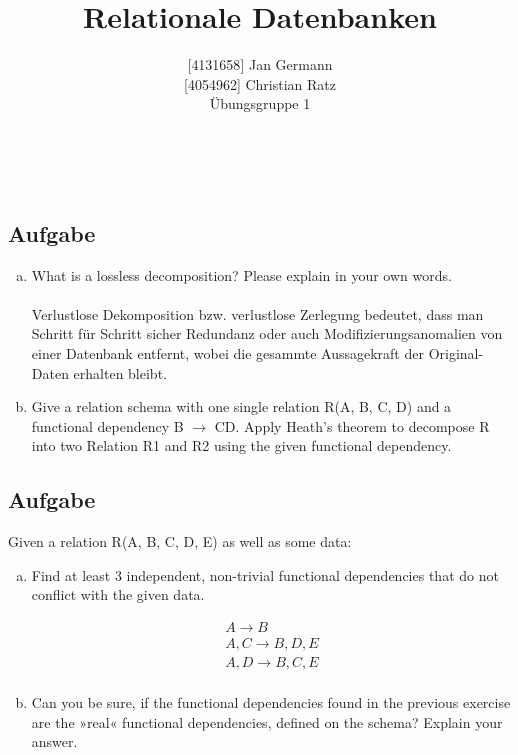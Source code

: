 \documentclass[11pt,a4paper,DIV=9]{scrartcl}
\author{{[}4131658{]} Jan Germann \\{[}4054962{]} Christian Ratz\\Übungsgruppe 1}
\title{Relationale Datenbanken}
\newcounter{temp}
\newcommand{\aufgabe}[1]{
  \setcounter{temp}{\value{subsection}}
  \setcounter{subsection}{#1}
  \addtocounter{subsection}{-1}
  \subsection{Aufgabe}
  \setcounter{subsection}{\value{temp}}
}
\renewcommand{\author}[1]{\renewcommand{\author}{#1}}
\renewcommand{\title}[1]{\renewcommand{\title}{#1}}
\newcommand{\makehomeworktitle}{
  \begin{minipage}[t]{6.5cm}
    \sf{\author}
  \end{minipage}
  \begin{minipage}[t]{6.5cm}
    \begin{flushright}
      \sf{\title\\\today}
    \end{flushright}
  \end{minipage}
  \\[0.2cm]
  \begin{center}
    \sf{
      \color{blue}{
        \LARGE{Aufgabenblatt \blattnr}
      }
    }
  \end{center}
  \vspace{0.1cm}
}
\begin{document}
\makehomeworktitle
\aufgabe{1}
  \begin{enumerate}[a.]
    \item What is a lossless decomposition? Please explain in your own words. \\\\
    Verlustlose Dekomposition bzw. verlustlose Zerlegung bedeutet, dass man Schritt f\"ur Schritt sicher Redundanz oder auch Modifizierungsanomalien von einer Datenbank entfernt, wobei die gesammte Aussagekraft der Original-Daten erhalten bleibt.
    \item Give a relation schema with one single relation R(A, B, C, D) and a functional dependency B $  \rightarrow $  CD. Apply Heath's theorem to decompose R into two Relation R1 and R2 using the given functional dependency.
  \end{enumerate}

\aufgabe{2}
  Given a relation R(A, B, C, D, E) as well as some data:
  \begin{enumerate}[a.]
    \item Find at least 3 independent, non-trivial functional dependencies that do not conflict with the given data.

    \begin{align}
      A\rightarrow B\\
      A, C \rightarrow B,D,E\\
      A, D \rightarrow B,C,E\\
    \end{align}

   \item Can you be sure, if the functional dependencies found in the previous exercise are the »real« functional dependencies, defined on the schema? Explain your answer.
  \end{enumerate}
\end{document}
